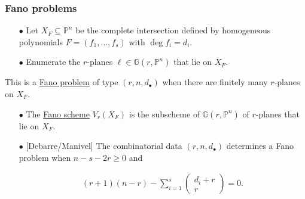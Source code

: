 \documentclass{beamer}
\theoremstyle{definition}
\newcommand{\blue}[1]{{\color{black!15!blue}\underline{#1}}}
\begin{document}
\begin{frame}
\frametitle{Fano problems}
\begin{enumerate}
\item[$\bullet$] Let $X_F\subseteq\mathbb{P}^n$ be the complete intersection defined by homogeneous polynomials $F=(f_1,\dotsc,f_s)$ with $\deg f_i = d_i$.

\item[$\bullet$] Enumerate the $r$-planes $\ell\in\mathbb{G}(r,\mathbb{P}^n)$ that lie on $X_F$. 
\end{enumerate}

This is a \blue{Fano problem} of type $(r,n,d_\bullet)$ when there are finitely many $r$-planes on $X_F$.

\begin{enumerate}
\pause

\item[$\bullet$] The \blue{Fano scheme} $V_r(X_F)$ is the subscheme of $\mathbb{G}(r,\mathbb{P}^n)$ of $r$-planes that lie on $X_F$.

\pause

\item[$\bullet$] [Debarre/Manivel] The combinatorial data $(r,n,d_\bullet)$ determines a Fano problem when $n-s-2r\ge 0$ and

\vspace{-.3cm}
\hspace{-1.2cm}
\begin{minipage}{.99\textwidth}
\begin{align*}
(r+1)(n-r) - \sum_{i=1}^s \left(\begin{smallmatrix}d_i + r\\r\end{smallmatrix}\right)=0.
\end{align*}
\end{minipage}
\end{enumerate}

\end{frame}
\end{document}
